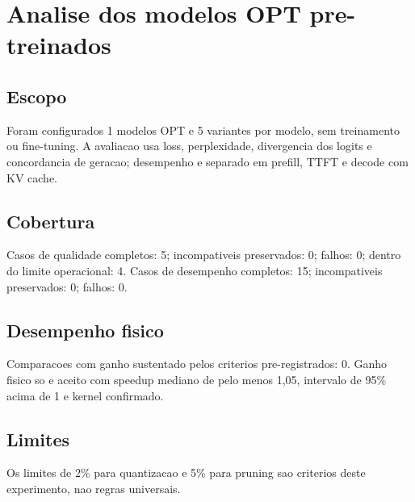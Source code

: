 \chapter{Analise dos modelos OPT pre-treinados}
\section{Escopo}
Foram configurados 1 modelos OPT e 5 variantes por modelo, sem treinamento ou fine-tuning.
A avaliacao usa loss, perplexidade, divergencia dos logits e concordancia de geracao; desempenho e separado em prefill, TTFT e decode com KV cache.
\section{Cobertura}
Casos de qualidade completos: 5; incompativeis preservados: 0; falhos: 0; dentro do limite operacional: 4.
Casos de desempenho completos: 15; incompativeis preservados: 0; falhos: 0.
\section{Desempenho fisico}
Comparacoes com ganho sustentado pelos criterios pre-registrados: 0.
Ganho fisico so e aceito com speedup mediano de pelo menos 1,05, intervalo de 95\% acima de 1 e kernel confirmado.
\section{Limites}
Os limites de 2\% para quantizacao e 5\% para pruning sao criterios deste experimento, nao regras universais.

